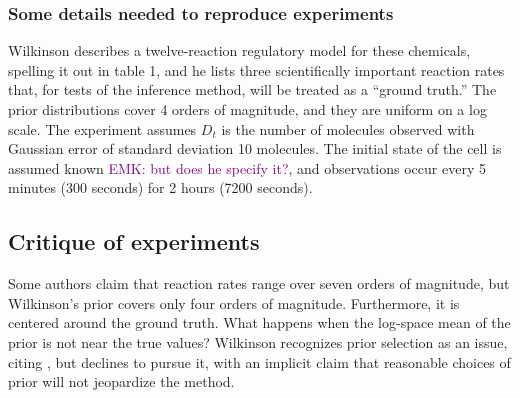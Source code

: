 \documentclass{article}
\newcommand\EMK[1]{\textcolor{purple}{EMK: #1}}
\begin{document}
\subsubsection{Some details needed to reproduce experiments}
Wilkinson describes a twelve-reaction regulatory model for these chemicals, spelling it out in table 1, and he lists three scientifically important reaction rates that, for tests of the inference method, will be treated as a ``ground truth.'' The prior distributions cover 4 orders of magnitude, and they are uniform on a log scale. The experiment assumes $D_t$ is the number of molecules observed with Gaussian error of standard deviation 10 molecules. %
The initial state of the cell is assumed known \EMK{but does he specify it?}, and observations occur every 5 minutes (300 seconds) for 2 hours (7200 seconds). 



 \subsection{Critique of experiments}
Some authors \cite{protein_interaction} claim that reaction rates range over seven orders of magnitude, but Wilkinson's prior covers only four orders of magnitude. Furthermore, it is centered around the ground truth. What happens when the log-space mean of the prior is not near the true values? Wilkinson recognizes prior selection as an issue, citing \cite{liebermeister2005biochemical}, but declines to pursue it, with an implicit claim that reasonable choices of prior will not jeopardize the method. 
\end{document}
